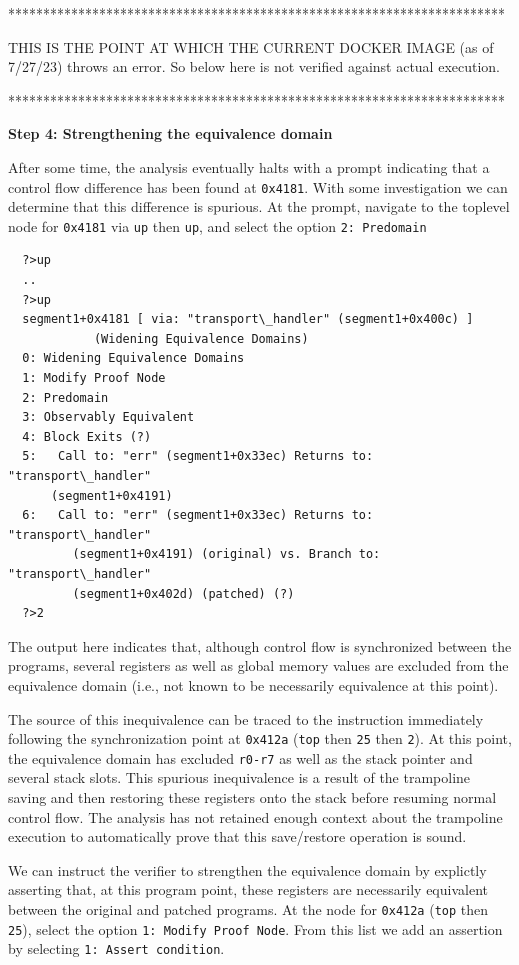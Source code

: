 ***********************************************************************

THIS IS THE POINT AT WHICH THE CURRENT DOCKER IMAGE (as of
7/27/23) throws an error.  So below here is not verified against actual execution.

***********************************************************************

\noindent\textbf{Step 4: Strengthening the equivalence domain}

After some time, the analysis eventually halts with a prompt indicating that a control flow difference
has been found at \texttt{0x4181}. With some investigation we can determine that this difference is spurious.
At the prompt, navigate to the toplevel node for \texttt{0x4181} via \texttt{up} then \texttt{up}, and
select the option \texttt{2: Predomain} 
\begin{verbatim}
  ?>up
  ..
  ?>up
  segment1+0x4181 [ via: "transport\_handler" (segment1+0x400c) ]
            (Widening Equivalence Domains)
  0: Widening Equivalence Domains
  1: Modify Proof Node
  2: Predomain
  3: Observably Equivalent
  4: Block Exits (?)
  5:   Call to: "err" (segment1+0x33ec) Returns to: "transport\_handler" 
      (segment1+0x4191)
  6:   Call to: "err" (segment1+0x33ec) Returns to: "transport\_handler" 
         (segment1+0x4191) (original) vs. Branch to: "transport\_handler"
         (segment1+0x402d) (patched) (?)  
  ?>2
\end{verbatim}

The output here indicates that, although control flow is synchronized between the programs, several
registers as well as global memory values are excluded from the equivalence domain (i.e., not known to
be necessarily equivalence at this point).

The source of this inequivalence can be traced to the instruction immediately following the
synchronization point at \texttt{0x412a} (\texttt{top} then \texttt{25} then \texttt{2}). At this
point, the equivalence domain has excluded \texttt{r0-r7} as well as the stack pointer and several
stack slots.  This spurious inequivalence is a result of the trampoline saving and then restoring
these registers onto the stack before resuming normal control flow. The analysis has not retained
enough context about the trampoline execution to automatically prove that this save/restore operation
is sound.

We can instruct the verifier to strengthen the equivalence domain by explictly asserting that, at this
program point, these registers are necessarily equivalent between the original and patched programs.
At the node for \texttt{0x412a} (\texttt{top} then \texttt{25}), select the option \texttt{1: Modify
  Proof Node}. From this list we add an assertion by selecting \texttt{1: Assert condition}.

